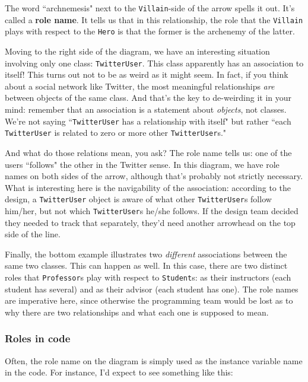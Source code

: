 The word ``archnemesis" next to the \texttt{Villain}-side of the arrow spells
it out. It's called a \textbf{role name}. It tells us that in this
relationship, the role that the \texttt{Villain} plays with respect to the
\texttt{Hero} is that the former is the archenemy of the latter.

Moving to the right side of the diagram, we have an interesting situation
involving only one class: \texttt{TwitterUser}. This class apparently has an
association to itself! This turns out not to be as weird as it might seem. In
fact, if you think about a social network like Twitter, the most meaningful
relationships \textit{are} between objects of the same class. And that's the
key to de-weirding it in your mind: remember that an association is a
statement about \textit{objects}, not classes. We're not saying
``\texttt{TwitterUser} has a relationship with itself" but rather ``each
\texttt{TwitterUser} is related to zero or more other \texttt{TwitterUser}s."

And what do those relations mean, you ask? The role name tells us: one of the
users ``follows" the other in the Twitter sense. In this diagram, we have role
names on both sides of the arrow, although that's probably not strictly
necessary. What is interesting here is the navigability of the association:
according to the design, a \texttt{TwitterUser} object is aware of what other
\texttt{TwitterUser}s follow him/her, but not which \texttt{TwitterUser}s
he/she follows. If the design team decided they needed to track that
separately, they'd need another arrowhead on the top side of the line.

Finally, the bottom example illustrates two \textit{different} associations
between the same two classes. This can happen as well. In this case, there are
two distinct roles that \texttt{Professor}s play with respect to
\texttt{Student}s: as their instructors (each student has several) and as
their advisor (each student has one). The role names are imperative here,
since otherwise the programming team would be lost as to why there are two
relationships and what each one is supposed to mean.

\subsubsection{Roles in code}

Often, the role name on the diagram is simply used as the instance variable
name in the code. For instance, I'd expect to see something like this:

